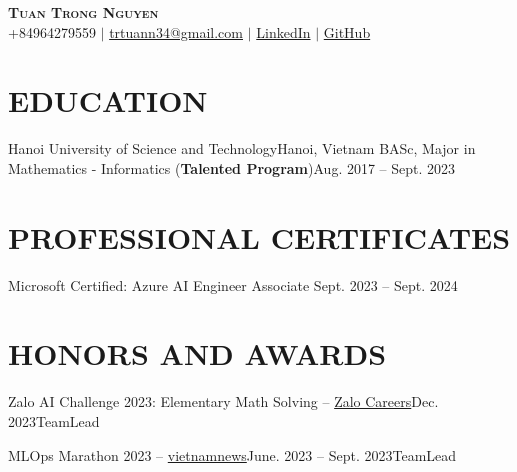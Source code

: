 \documentclass[letterpaper,11pt]{article}
\begin{document}
\begin{center}
    \textbf{\Huge \scshape Tuan Trong Nguyen} \\ \vspace{1pt}
    {\color{Blue} +84964279559} $|$
    \href{mailto:trtuann34@gmail.com}{\color{Blue}trtuann34@gmail.com} $|$
    \href{https://www.linkedin.com/in/santapo/}{\color{Blue}LinkedIn} $|$
    \href{https://github.com/santapo}{\color{Blue}GitHub}
\end{center}

\section{EDUCATION}
  \resumeSubHeadingListStart
    \resumeSubheading
      {Hanoi University of Science and Technology}{Hanoi, Vietnam}
      {BASc, Major in Mathematics - Informatics (\textbf{Talented Program})}{Aug. 2017 -- Sept. 2023}
  \resumeSubHeadingListEnd

\section{PROFESSIONAL CERTIFICATES}
\resumeSubHeadingListStart
    \resumeSubheading
      {Microsoft Certified: Azure AI Engineer Associate}{}
      {Sept. 2023 -- Sept. 2024}{}
\resumeSubHeadingListEnd


\section{HONORS AND AWARDS}
\resumeSubHeadingListStart

      \resumeSubheading
        {Zalo AI Challenge 2023: Elementary Math Solving -- \textmd{\href{https://web.facebook.com/share/p/16pKFajqJx/}{\color{blue} Zalo Careers}}}{Dec. 2023}{TeamLead}{}
        \resumeItemListStart
      \resumeItemListEnd

      \resumeSubheading
        {MLOps Marathon 2023 -- \textmd{\href{https://vietnamnews.vn/opinion/1593730/developing-machine-learning-operations-key-to-vn-to-reach-the-world-s-tech-level.html}{\color{blue} vietnamnews}}}{June. 2023 -- Sept. 2023}{TeamLead}{}
        \resumeItemListStart
      \resumeItemListEnd
\end{document}
